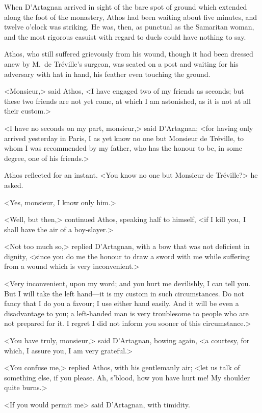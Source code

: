 When D'Artagnan arrived in sight of the bare spot of ground which extended along the foot of the monastery, Athos had been waiting about five minutes, and twelve o'clock was striking. He was, then, as punctual as the Samaritan woman, and the most rigorous casuist with regard to duels could have nothing to say. 

Athos, who still suffered grievously from his wound, though it had been dressed anew by M.~de Tréville's surgeon, was seated on a post and waiting for his adversary with hat in hand, his feather even touching the ground. 

<Monsieur,> said Athos, <I have engaged two of my friends as seconds; but these two friends are not yet come, at which I am astonished, as it is not at all their custom.> 

<I have no seconds on my part, monsieur,> said D'Artagnan; <for having only arrived yesterday in Paris, I as yet know no one but Monsieur de Tréville, to whom I was recommended by my father, who has the honour to be, in some degree, one of his friends.> 

Athos reflected for an instant. <You know no one but Monsieur de Tréville?> he asked. 

<Yes, monsieur, I know only him.> 

<Well, but then,> continued Athos, speaking half to himself, <if I kill you, I shall have the air of a boy-slayer.> 

<Not too much so,> replied D'Artagnan, with a bow that was not deficient in dignity, <since you do me the honour to draw a sword with me while suffering from a wound which is very inconvenient.> 

<Very inconvenient, upon my word; and you hurt me devilishly, I can tell you. But I will take the left hand—it is my custom in such circumstances. Do not fancy that I do you a favour; I use either hand easily. And it will be even a disadvantage to you; a left-handed man is very troublesome to people who are not prepared for it. I regret I did not inform you sooner of this circumstance.> 

<You have truly, monsieur,> said D'Artagnan, bowing again, <a courtesy, for which, I assure you, I am very grateful.> 

<You confuse me,> replied Athos, with his gentlemanly air; <let us talk of something else, if you please. Ah, s'blood, how you have hurt me! My shoulder quite burns.> 

<If you would permit me\longdash> said D'Artagnan, with timidity. 

